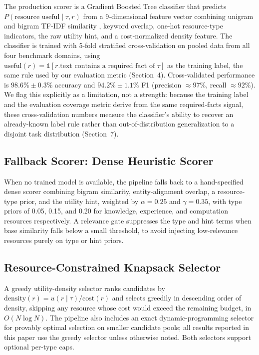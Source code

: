 \documentclass{article}
\begin{document}
The production scorer is a Gradient Boosted Tree classifier \citep{chen2016xgboost} that predicts $P(\text{resource useful} \mid \tau, r)$ from a 9-dimensional feature vector combining unigram and bigram TF-IDF similarity \citep{pedregosa2011scikit}, keyword overlap, one-hot resource-type indicators, the raw utility hint, and a cost-normalized density feature. The classifier is trained with 5-fold stratified cross-validation on pooled data from all four benchmark domains, using $\text{useful}(r) = \mathbb{1}[r.\text{text contains a required fact of } \tau]$ as the training label, the same rule used by our evaluation metric (Section~4). Cross-validated performance is $98.6\% \pm 0.3\%$ accuracy and $94.2\% \pm 1.1\%$ F1 (precision $\approx 97\%$, recall $\approx 92\%$). We flag this explicitly as a limitation, not a strength: because the training label and the evaluation coverage metric derive from the same required-facts signal, these cross-validation numbers measure the classifier's ability to recover an already-known label rule rather than out-of-distribution generalization to a disjoint task distribution (Section~7).

\subsection{Fallback Scorer: Dense Heuristic Scorer}

When no trained model is available, the pipeline falls back to a hand-specified dense scorer combining bigram similarity, entity-alignment overlap, a resource-type prior, and the utility hint, weighted by $\alpha = 0.25$ and $\gamma = 0.35$, with type priors of 0.05, 0.15, and 0.20 for knowledge, experience, and computation resources respectively. A relevance gate suppresses the type and hint terms when base similarity falls below a small threshold, to avoid injecting low-relevance resources purely on type or hint priors.

\subsection{Resource-Constrained Knapsack Selector}

A greedy utility-density selector ranks candidates by $\text{density}(r) = u(r \mid \tau) / \text{cost}(r)$ and selects greedily in descending order of density, skipping any resource whose cost would exceed the remaining budget, in $O(N \log N)$. The pipeline also includes an exact dynamic-programming selector for provably optimal selection on smaller candidate pools; all results reported in this paper use the greedy selector unless otherwise noted. Both selectors support optional per-type caps.
\end{document}
